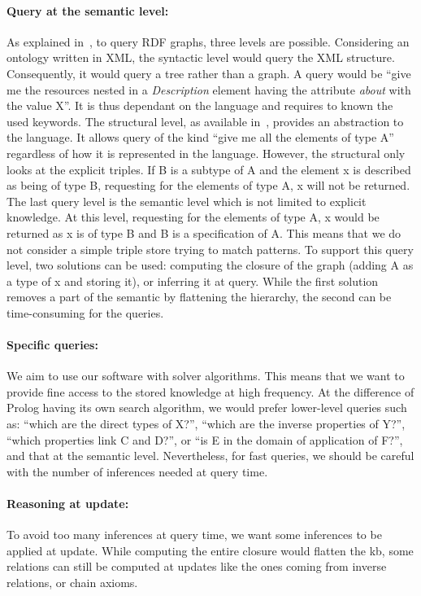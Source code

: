 \paragraph{Query at the semantic level:} As explained in~\cite{broekstra_2002_sesame}, to query RDF graphs, three levels are possible. Considering an ontology written in XML, the syntactic level would query the XML structure. Consequently, it would query a tree rather than a graph. A query would be ``give me the resources nested in a \textit{Description} element having the attribute \textit{about} with the value X''. It is thus dependant on the language and requires to known the used keywords. The structural level, as available in~\cite{lassila_1998_resource}, provides an abstraction to the language. It allows query of the kind ``give me all the elements of type A'' regardless of how it is represented in the language. However, the structural only looks at the explicit triples. If B is a subtype of A and the element x is described as being of type B, requesting for the elements of type A, x will not be returned. The last query level is the semantic level which is not limited to explicit knowledge. At this level, requesting for the elements of type A, x would be returned as x is of type B and B is a specification of A. This means that we do not consider a simple triple store trying to match patterns. To support this query level, two solutions can be used: computing the closure of the graph (adding A as a type of x and storing it), or inferring it at query. While the first solution removes a part of the semantic by flattening the hierarchy, the second can be time-consuming for the queries.

\paragraph{Specific queries:} We aim to use our software with solver algorithms. This means that we want to provide fine access to the stored knowledge at high frequency. At the difference of Prolog having its own search algorithm, we would prefer lower-level queries such as: ``which are the direct types of X?'', ``which are the inverse properties of Y?'', ``which properties link C and D?'', or ``is E in the domain of application of F?'', and that at the semantic level. Nevertheless, for fast queries, we should be careful with the number of inferences needed at query time.

\paragraph{Reasoning at update:} To avoid too many inferences at query time, we want some inferences to be applied at update. While computing the entire closure would flatten the \acrshort{kb}, some relations can still be computed at updates like the ones coming from inverse relations, or chain axioms.

